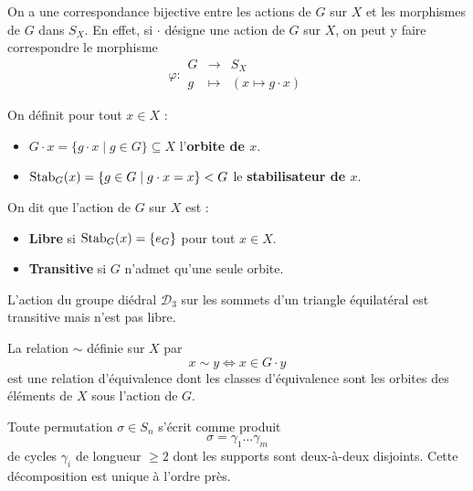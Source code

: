 	\begin{theorem}
		On a une correspondance bijective entre les actions de $G$ sur $X$ et les morphismes de $G$ dans $S_X$. En effet, si $\cdot$ désigne une action de $G$ sur $X$, on peut y faire correspondre le morphisme
		\[ \varphi :
		\begin{array}{ccc}
			G &\rightarrow& S_X \\
			g &\mapsto& (x \mapsto g \cdot x)
		\end{array}
		\]
	\end{theorem}

	\begin{definition}
		On définit pour tout $x \in X$ :
		\begin{itemize}
			\item $G \cdot x = \{ g \cdot x \mid g \in G \} \subseteq X$ l'\textbf{orbite de $x$}.
			\item $\operatorname{Stab}_G(x) = \{ g \in G \mid g \cdot x = x \} < G$ le \textbf{stabilisateur de $x$}.
		\end{itemize}
		On dit que l'action de $G$ sur $X$ est :
		\begin{itemize}
			\item \textbf{Libre} si $\operatorname{Stab}_G(x) = \{ e_G \}$ pour tout $x \in X$.
			\item \textbf{Transitive} si $G$ n'admet qu'une seule orbite.
		\end{itemize}
	\end{definition}

	\begin{example}
		L'action du groupe diédral $\mathcal{D}_3$ sur les sommets d'un triangle équilatéral est transitive mais n'est pas libre.
	\end{example}

	\begin{proposition}
		\label{101-1}
		La relation $\sim$ définie sur $X$ par
		\[ x \sim y \iff x \in G \cdot y \]
		est une relation d'équivalence dont les classes d'équivalence sont les orbites des éléments de $X$ sous l'action de $G$.
	\end{proposition}


	\begin{application}
		Toute permutation $\sigma \in S_n$ s'écrit comme produit
		\[ \sigma = \gamma_1 \dots \gamma_m \]
		de cycles $\gamma_i$ de longueur $\geq 2$ dont les supports sont deux-à-deux disjoints. Cette décomposition est unique à l'ordre près.
	\end{application}

